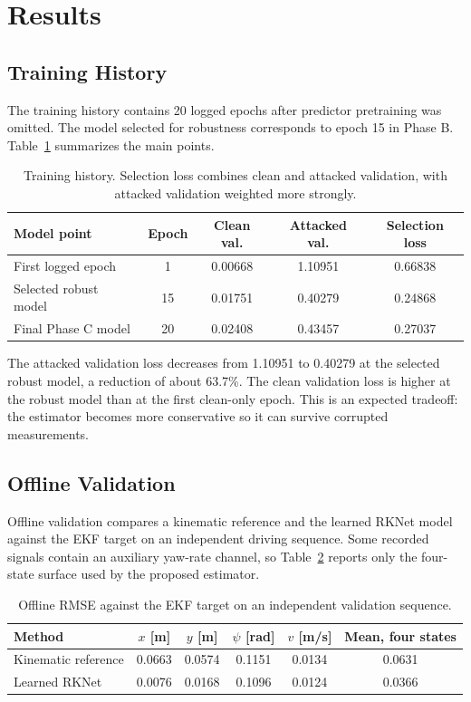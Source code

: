 \documentclass[11pt,a4paper]{article}
\begin{document}
\section{Results}

\subsection{Training History}

The training history contains 20 logged epochs after predictor pretraining was
omitted. The model selected for robustness corresponds to epoch 15 in Phase B.
Table~\ref{tab:train_result} summarizes the main points.

\begin{table}[htbp]
\centering
\caption{Training history. Selection loss combines clean and attacked
validation, with attacked validation weighted more strongly.}
\label{tab:train_result}
\begin{tabular}{lcccc}
\toprule
Model point & Epoch & Clean val. & Attacked val. & Selection loss \\
\midrule
First logged epoch & 1 & 0.00668 & 1.10951 & 0.66838 \\
Selected robust model & 15 & 0.01751 & 0.40279 & 0.24868 \\
Final Phase C model & 20 & 0.02408 & 0.43457 & 0.27037 \\
\bottomrule
\end{tabular}
\end{table}

The attacked validation loss decreases from 1.10951 to 0.40279 at the selected
robust model, a reduction of about 63.7\%. The clean validation loss is higher
at the robust model than at the first clean-only epoch. This is an expected
tradeoff: the estimator becomes more conservative so it can survive corrupted
measurements.

\subsection{Offline Validation}

Offline validation compares a kinematic reference and the learned RKNet model
against the EKF target on an independent driving sequence. Some recorded
signals contain an auxiliary yaw-rate channel, so Table~\ref{tab:offline_rmse}
reports only the four-state surface used by the proposed estimator.

\begin{table}[htbp]
\centering
\caption{Offline RMSE against the EKF target on an independent validation
sequence.}
\label{tab:offline_rmse}
\begin{tabular}{lccccc}
\toprule
Method & $x$ [m] & $y$ [m] & $\psi$ [rad] & $v$ [m/s] & Mean, four states \\
\midrule
Kinematic reference & 0.0663 & 0.0574 & 0.1151 & 0.0134 & 0.0631 \\
Learned RKNet & 0.0076 & 0.0168 & 0.1096 & 0.0124 & 0.0366 \\
\bottomrule
\end{tabular}
\end{table}
\end{document}
